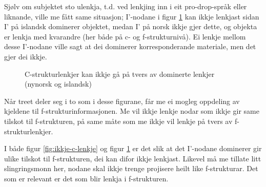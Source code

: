 \documentclass[12pt,a4paper,oneside,draft]{report}
\newcommand{\proj}[2]{\begin{tabular}{c}\footnotesize{#1}\\\normalsize{#2}\end{tabular}}
\newcommand{\ua}{\ensuremath{\uparrow}}
\newcommand{\da}{\ensuremath{\downarrow}}
\begin{document}
Sjølv om subjektet sto ulenkja, t.d. ved lenkjing inn i eit
pro-drop-språk eller liknande, ville me fått same situasjon; I'-nodane
i figur \ref{fig:ikkje-c-lenkje-pro-drop} kan ikkje lenkjast sidan I'
på islandsk dominerer objektet, medan I' på norsk ikkje gjer dette, og
objekta er lenkja med kvarandre (her både på c- og f-strukturnivå). Ei
lenkje mellom desse I'-nodane ville sagt at dei dominerer
korresponderande materiale, men det gjer dei ikkje.

  \begin{figure}[htp]
  \centering
     \caption{C-strukturlenkjer kan ikkje gå på tvers av dominerte
     lenkjer (nynorsk og islandsk)}
     \label{fig:ikkje-c-lenkje-pro-drop}
    \end{figure}


Når treet deler seg i to som i desse figurane, får me ei mogleg
oppdeling av kjeldene til f-strukturinformasjonen. Me vil ikkje lenkje
nodar som ikkje gir same tilskot til f-strukturen, på same måte som me
ikkje vil lenkje på tvers av f-strukturlenkjer.

I både figur \ref{fig:ikkje-c-lenkje} og figur
\ref{fig:ikkje-c-lenkje-pro-drop} er det slik at det I'-nodane dominerer gir
ulike tilskot til f-strukturen, dei kan difor ikkje lenkjast. Likevel
må me tillate litt slingringsmonn her, nodane skal ikkje trenge
projisere heilt like f-strukturar. Det som er relevant er det som blir
lenkja i f-strukturen.
\end{document}

